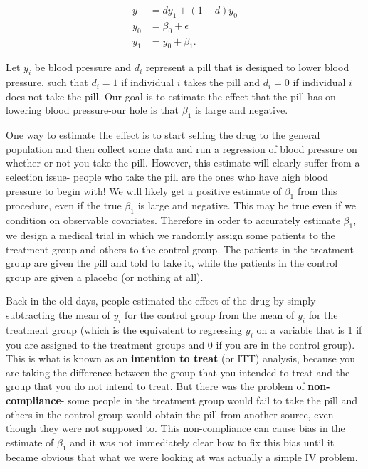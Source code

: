 \documentclass[
]{article}
\begin{document}
\[
\begin{aligned}
y&=dy_1+(1-d)y_0\\
y_0&=\beta_0+\epsilon\\
y_1&=y_0+\beta_1.
\end{aligned}
\]

Let \(y_i\) be blood pressure and \(d_i\) represent a pill that is
designed to lower blood pressure, such that \(d_i=1\) if individual
\(i\) takes the pill and \(d_i=0\) if individual \(i\) does not take the
pill. Our goal is to estimate the effect that the pill has on lowering
blood pressure-our hole is that \(\beta_1\) is large and negative.

One way to estimate the effect is to start selling the drug to the
general population and then collect some data and run a regression of
blood pressure on whether or not you take the pill. However, this
estimate will clearly suffer from a selection issue- people who take the
pill are the ones who have high blood pressure to begin with! We will
likely get a positive estimate of \(\beta_1\) from this procedure, even
if the true \(\beta_1\) is large and negative. This may be true even if
we condition on observable covariates. Therefore in order to accurately
estimate \(\beta_1\), we design a medical trial in which we randomly
assign some patients to the treatment group and others to the control
group. The patients in the treatment group are given the pill and told
to take it, while the patients in the control group are given a placebo
(or nothing at all).

Back in the old days, people estimated the effect of the drug by simply
subtracting the mean of \(y_i\) for the control group from the mean of
\(y_i\) for the treatment group (which is the equivalent to regressing
\(y_i\) on a variable that is 1 if you are assigned to the treatment
groups and 0 if you are in the control group). This is what is known as
an \textbf{intention to treat} (or ITT) analysis, because you are taking
the difference between the group that you intended to treat and the
group that you do not intend to treat. But there was the problem of
\textbf{non-compliance}- some people in the treatment group would fail
to take the pill and others in the control group would obtain the pill
from another source, even though they were not supposed to. This
non-compliance can cause bias in the estimate of \(\beta_1\) and it was
not immediately clear how to fix this bias until it became obvious that
what we were looking at was actually a simple IV problem.
\end{document}
